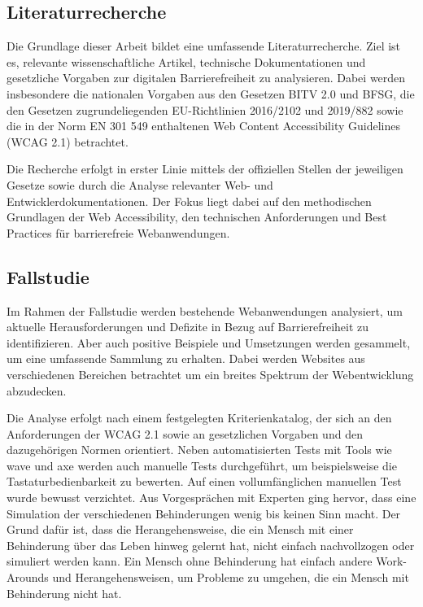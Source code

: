 \subsection{Literaturrecherche} 

Die Grundlage dieser Arbeit bildet eine umfassende Literaturrecherche. Ziel ist es, relevante wissenschaftliche Artikel, technische Dokumentationen und gesetzliche Vorgaben zur digitalen Barrierefreiheit zu analysieren. Dabei werden insbesondere die nationalen Vorgaben aus den Gesetzen BITV 2.0 und BFSG, die den Gesetzen zugrundeliegenden EU-Richtlinien 2016/2102 und 2019/882 sowie die in der Norm EN 301 549 enthaltenen Web Content Accessibility Guidelines (WCAG 2.1) betrachtet.

Die Recherche erfolgt in erster Linie mittels der offiziellen Stellen der jeweiligen Gesetze sowie durch die Analyse relevanter Web- und Entwicklerdokumentationen. Der Fokus liegt dabei auf den methodischen Grundlagen der Web Accessibility, den technischen Anforderungen und Best Practices für barrierefreie Webanwendungen.

\subsection{Fallstudie}

Im Rahmen der Fallstudie werden bestehende Webanwendungen analysiert, um aktuelle Herausforderungen und Defizite in Bezug auf Barrierefreiheit zu identifizieren. Aber auch positive Beispiele und Umsetzungen werden gesammelt, um eine umfassende Sammlung zu erhalten. Dabei werden Websites aus verschiedenen Bereichen betrachtet um ein breites Spektrum der Webentwicklung abzudecken.

Die Analyse erfolgt nach einem festgelegten Kriterienkatalog, der sich an den Anforderungen der WCAG 2.1 sowie an gesetzlichen Vorgaben und den dazugehörigen Normen orientiert. Neben automatisierten Tests mit Tools wie wave und axe werden auch manuelle Tests durchgeführt, um beispielsweise die Tastaturbedienbarkeit zu bewerten. Auf einen vollumfänglichen manuellen Test wurde bewusst verzichtet. Aus Vorgesprächen mit Experten ging hervor, dass eine Simulation der verschiedenen Behinderungen wenig bis keinen Sinn macht. Der Grund dafür ist, dass die Herangehensweise, die ein Mensch mit einer Behinderung über das Leben hinweg gelernt hat, nicht einfach nachvollzogen oder simuliert werden kann. Ein Mensch ohne Behinderung hat einfach andere Work-Arounds und Herangehensweisen, um Probleme zu umgehen, die ein Mensch mit Behinderung nicht hat. 

